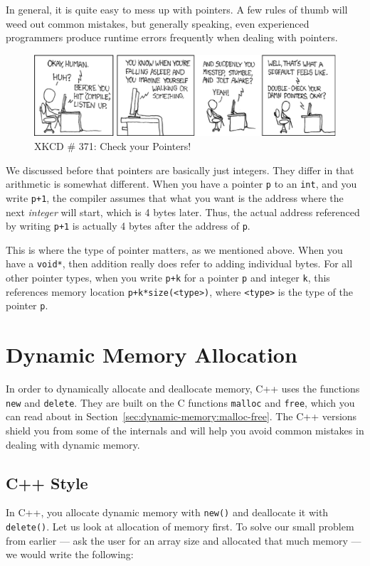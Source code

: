 In general, it is quite easy to mess up with pointers.
A few rules of thumb will weed out common mistakes,
but generally speaking, even experienced programmers produce runtime
errors frequently when dealing with pointers.

\begin{figure}[htb]
\centering
\includegraphics[scale=0.6]{assets/xkcd_compiler_complaint.eps}
\caption{XKCD \# 371: Check your Pointers!}
\end{figure}


We discussed before that pointers are basically just integers.
They differ in that arithmetic is somewhat different.
When you have a pointer \texttt{p} to an \texttt{int},
and you write \texttt{p+1},
the compiler assumes that what you want is the address
where the next \emph{integer} will start, which is 4 bytes later.
Thus, the actual address referenced by writing \texttt{p+1} is actually
4 bytes after the address of \texttt{p}.

This is where the type of pointer matters, as we mentioned above. 
When you have a \texttt{void*}, then addition really does refer to
adding individual bytes. For all other pointer types, when you write
\texttt{p+k} for a pointer \texttt{p} and integer \texttt{k}, 
this references memory location \texttt{p+k*size(<type>)}, where
\texttt{<type>} is the type of the pointer \texttt{p}.

\section{Dynamic Memory Allocation}
In order to dynamically allocate and deallocate memory,
C++ uses the functions \texttt{new} and \texttt{delete}.
They are built on the C functions \texttt{malloc} and \texttt{free},
which you can read about in Section~\ref{sec:dynamic-memory:malloc-free}.
The C++ versions shield you from some of the internals and will help
you avoid common mistakes in dealing with dynamic memory.

\subsection{C++ Style}
In C++, you allocate dynamic memory with \texttt{new()}
and deallocate it with \texttt{delete()}.
Let us look at allocation of memory first.
To solve our small problem from earlier --- ask the user for an array
size and allocated that much memory --- we would write the following:

